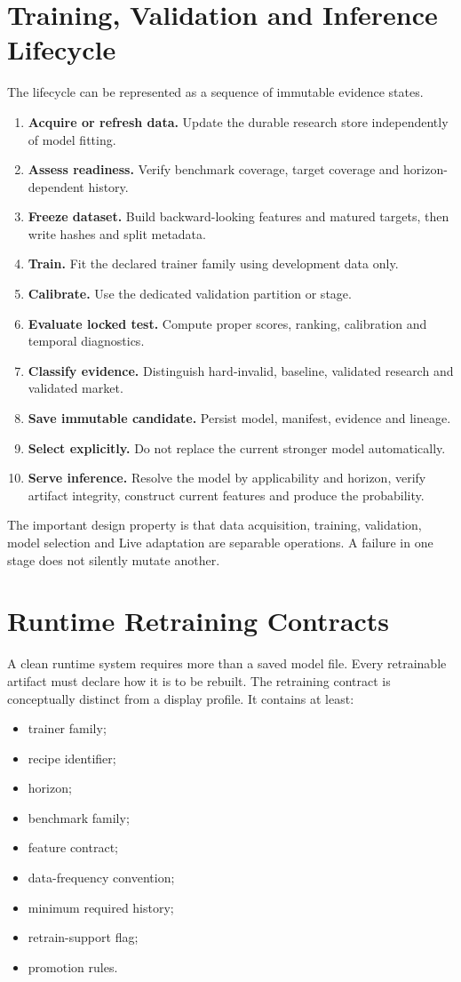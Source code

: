 \documentclass[11pt]{article}
\begin{document}
\section{Training, Validation and Inference Lifecycle}
The lifecycle can be represented as a sequence of immutable evidence states.
\begin{enumerate}[itemsep=0.2em]
\item \textbf{Acquire or refresh data.} Update the durable research store independently of model fitting.
\item \textbf{Assess readiness.} Verify benchmark coverage, target coverage and horizon-dependent history.
\item \textbf{Freeze dataset.} Build backward-looking features and matured targets, then write hashes and split metadata.
\item \textbf{Train.} Fit the declared trainer family using development data only.
\item \textbf{Calibrate.} Use the dedicated validation partition or stage.
\item \textbf{Evaluate locked test.} Compute proper scores, ranking, calibration and temporal diagnostics.
\item \textbf{Classify evidence.} Distinguish hard-invalid, baseline, validated research and validated market.
\item \textbf{Save immutable candidate.} Persist model, manifest, evidence and lineage.
\item \textbf{Select explicitly.} Do not replace the current stronger model automatically.
\item \textbf{Serve inference.} Resolve the model by applicability and horizon, verify artifact integrity, construct current features and produce the probability.
\end{enumerate}

The important design property is that data acquisition, training, validation, model selection and Live adaptation are separable operations. A failure in one stage does not silently mutate another.

\section{Runtime Retraining Contracts}
A clean runtime system requires more than a saved model file. Every retrainable artifact must declare how it is to be rebuilt. The retraining contract is conceptually distinct from a display profile. It contains at least:
\begin{itemize}[itemsep=0.15em]
\item trainer family;
\item recipe identifier;
\item horizon;
\item benchmark family;
\item feature contract;
\item data-frequency convention;
\item minimum required history;
\item retrain-support flag;
\item promotion rules.
\end{itemize}
\end{document}
